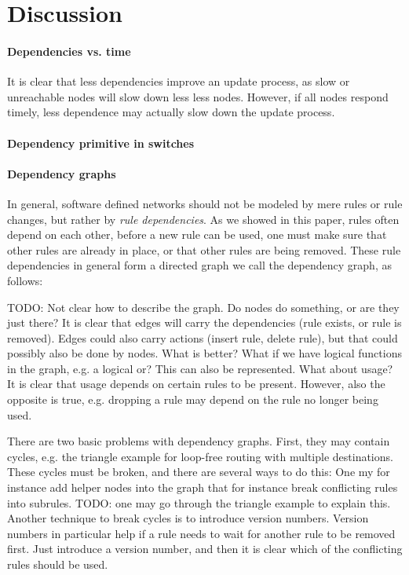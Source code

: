 \section{Discussion}
\label{sec:discussion}

\paragraph{Dependencies vs. time} It is clear that less dependencies improve an update process, as slow or unreachable nodes will slow down less less nodes. However, if all nodes respond timely, less dependence may actually slow down the update process. 

\paragraph{Dependency primitive in switches}

\paragraph{Dependency graphs}

In general, software defined networks should not be modeled by mere rules or rule changes, but rather by \emph{rule dependencies}. As we showed in this paper, rules often depend on each other, before a new rule can be used, one must make sure that other rules are already in place, or that other rules are being removed. These rule dependencies in general form a directed graph we call the dependency graph, as follows:

TODO: Not clear how to describe the graph. Do nodes do something, or are they just there? It is clear that edges will carry the dependencies (rule exists, or rule is removed). Edges could also carry actions (insert rule, delete rule), but that could possibly also be done by nodes. What is better? What if we have logical functions in the graph, e.g. a logical or? This can also be represented. What about usage? It is clear that usage depends on certain rules to be present. However, also the opposite is true, e.g. dropping a rule may depend on the rule no longer being used.

There are two basic problems with dependency graphs. First, they may contain cycles, e.g. the triangle example for loop-free routing with multiple destinations. These cycles must be broken, and there are several ways to do this: One my for instance add helper nodes into the graph that for instance break conflicting rules into subrules. TODO: one may go through the triangle example to explain this. Another technique to break cycles is to introduce version numbers. Version numbers in particular help if a rule needs to wait for another rule to be removed first. Just introduce a version number, and then it is clear which of the conflicting rules should be used. 

